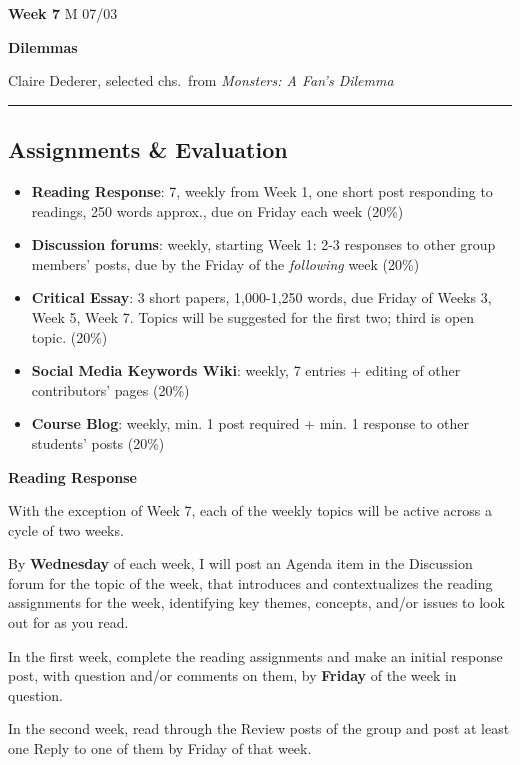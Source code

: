 \documentclass[
  letterpaper,
  DIV=11,
  numbers=noendperiod]{scrartcl}
\providecommand{\tightlist}{%
  \setlength{\itemsep}{0pt}\setlength{\parskip}{0pt}}\usepackage{longtable,booktabs,array}
\begin{document}
\textbf{Week 7} M 07/03

\textbf{Dilemmas}

Claire Dederer, selected chs.~from \emph{Monsters: A Fan's Dilemma}

\begin{center}\rule{0.5\linewidth}{0.5pt}\end{center}

\hypertarget{assignments-evaluation}{%
\subsection{Assignments \& Evaluation}\label{assignments-evaluation}}

\begin{itemize}
\tightlist
\item
  \textbf{Reading Response}: 7, weekly from Week 1, one short post
  responding to readings, 250 words approx., due on Friday each week
  (20\%)
\item
  \textbf{Discussion forums}: weekly, starting Week 1: 2-3 responses to
  other group members' posts, due by the Friday of the \emph{following}
  week (20\%)
\item
  \textbf{Critical Essay}: 3 short papers, 1,000-1,250 words, due Friday
  of Weeks 3, Week 5, Week 7. Topics will be suggested for the first
  two; third is open topic. (20\%)
\item
  \textbf{Social Media Keywords Wiki}: weekly, 7 entries + editing of
  other contributors' pages (20\%)
\item
  \textbf{Course Blog}: weekly, min. 1 post required + min. 1 response
  to other students' posts (20\%)
\end{itemize}

\textbf{Reading Response}

With the exception of Week 7, each of the weekly topics will be active
across a cycle of two weeks.

By \textbf{Wednesday} of each week, I will post an Agenda item in the
Discussion forum for the topic of the week, that introduces and
contextualizes the reading assignments for the week, identifying key
themes, concepts, and/or issues to look out for as you read.

In the first week, complete the reading assignments and make an initial
response post, with question and/or comments on them, by \textbf{Friday}
of the week in question.

In the second week, read through the Review posts of the group and post
at least one Reply to one of them by Friday of that week.
\end{document}
